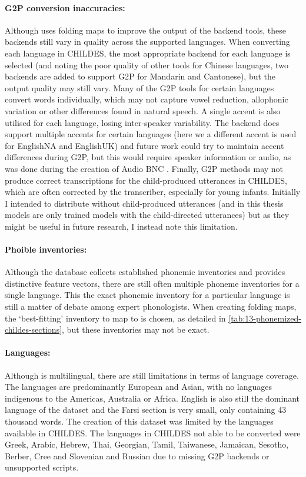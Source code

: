 \paragraph{G2P conversion inaccuracies:} Although \gpp uses folding maps to improve the output of the backend tools, these backends still vary in quality across the supported languages. When converting each language in CHILDES, the most appropriate backend for each language is selected (and noting the poor quality of other tools for Chinese languages, two backends are added to support G2P for Mandarin and Cantonese), but the output quality may still vary. Many of the G2P tools for certain languages convert words individually, which may not capture vowel reduction, allophonic variation or other differences found in natural speech. A single accent is also utilised for each language, losing inter-speaker variability. The  backend does support multiple accents for certain languages (here we a different accent is used for EnglishNA and EnglishUK) and future work could try to maintain accent differences during G2P, but this would require speaker information or audio, as was done during the creation of Audio BNC \citep{coleman2012audio}. Finally, G2P methods may not produce correct transcriptions for the child-produced utterances in CHILDES, which are often corrected by the transcriber, especially for young infants. Initially I intended to distribute \ipachildes without child-produced utterances (and in this thesis models are only trained models with the child-directed utterances) but as they might be useful in future research, I instead note this limitation.

\paragraph{Phoible inventories:} Although the \phoible database collects established phonemic inventories and provides distinctive feature vectors, there are still often multiple phoneme inventories for a single language. This the exact phonemic inventory for a particular language is still a matter of debate among expert phonologists. When creating folding maps, the `best-fitting' inventory to map to is chosen, as detailed in \cref{tab:13-phonemized-childes-sections}, but these inventories may not be exact.

\paragraph{Languages:} Although \ipachildes is multilingual, there are still limitations in terms of language coverage. The languages are predominantly European and Asian, with no languages indigenous to the Americas, Australia or Africa. English is also still the dominant language of the dataset and the Farsi section is very small, only containing 43 thousand words. The creation of this dataset was limited by the languages available in CHILDES. The languages in CHILDES not able to be converted were Greek, Arabic, Hebrew, Thai, Georgian, Tamil, Taiwanese, Jamaican, Sesotho, Berber, Cree and Slovenian and Russian due to missing G2P backends or unsupported scripts.

